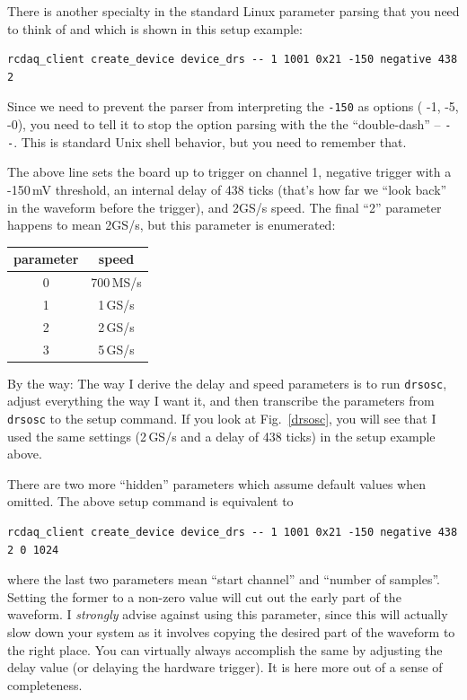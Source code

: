 \documentclass{article}[11pt]
\begin{document}
There is another specialty in the standard Linux parameter
parsing that you need to think of and which is shown in this setup
example:

\begin{verbatim}
rcdaq_client create_device device_drs -- 1 1001 0x21 -150 negative 438 2
\end{verbatim}

Since we need to prevent the parser from interpreting the \verb|-150|
as options ( -1, -5, -0), you need to tell it to stop the option
parsing with the the ``double-dash'' -- \verb|--|. This is standard
Unix shell behavior, but you need to remember that.

The above line sets the board up to trigger on channel 1, negative trigger
with a -150\,mV threshold, an internal delay of 438 ticks (that's how
far we ``look back'' in the waveform before the trigger), and 2GS/s
speed. The final ``2'' parameter happens to mean 2GS/s, but this
parameter is enumerated:

\begin{center}
\begin{tabular}{|c|c|}
\hline
parameter & speed \\
\hline
\hline
    0 & 700\,MS/s  \\ \hline
    1 & 1\,GS/s   \\ \hline
    2 & 2\,GS/s   \\ \hline
    3 & 5\,GS/s   \\ \hline
\end{tabular}
\end{center}

By the way: The way I derive the delay and speed parameters is to run
\verb|drsosc|, adjust everything the way I want it, and then
transcribe the parameters from \verb|drsosc| to the setup command. If
you look at Fig.~\ref{drsosc}, you will see that I used the same
settings (2\,GS/s and a delay of 438 ticks) in the setup example
above.

There are two more ``hidden'' parameters which assume default values
when omitted.  The above setup command is equivalent to

\begin{verbatim}
rcdaq_client create_device device_drs -- 1 1001 0x21 -150 negative 438 2 0 1024
\end{verbatim}

where the last two parameters mean ``start channel'' and ``number of
samples''. Setting the former to a non-zero value will cut out the
early part of the waveform. I \emph{strongly} advise against using
this parameter, since this will actually slow down your system as it
involves copying the desired part of the waveform to the right place.
You can virtually always accomplish the same by adjusting the delay
value (or delaying the hardware trigger). It is here more
out of a sense of completeness.
\end{document}
